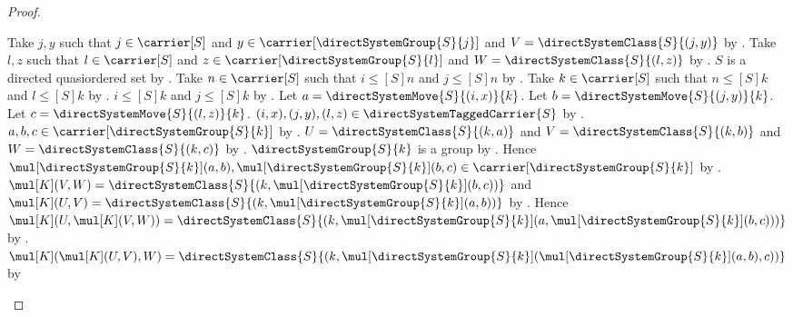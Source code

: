 \begin{proof}
\begin{subproof}
        Take $j,y$ such that $j\in\carrier[S]$ and
            $y\in\carrier[\directSystemGroup{S}{j}]$ and
            $V=\directSystemClass{S}{(j,y)}$ by
            .
        Take $l,z$ such that $l\in\carrier[S]$ and
            $z\in\carrier[\directSystemGroup{S}{l}]$ and
            $W=\directSystemClass{S}{(l,z)}$ by
            .
        $S$ is a directed quasiordered set by
            .
        Take $n\in\carrier[S]$ such that
            $i\mathrel{\leq[S]}n$ and $j\mathrel{\leq[S]}n$ by
            .
        Take $k\in\carrier[S]$ such that
            $n\mathrel{\leq[S]}k$ and $l\mathrel{\leq[S]}k$ by
            .
        $i\mathrel{\leq[S]}k$ and $j\mathrel{\leq[S]}k$ by
            .
        Let $a=\directSystemMove{S}{(i,x)}{k}$.
        Let $b=\directSystemMove{S}{(j,y)}{k}$.
        Let $c=\directSystemMove{S}{(l,z)}{k}$.
        $(i,x),(j,y),(l,z)\in\directSystemTaggedCarrier{S}$ by
            .
        $a,b,c\in\carrier[\directSystemGroup{S}{k}]$ by
            .
        $U=\directSystemClass{S}{(k,a)}$ and
            $V=\directSystemClass{S}{(k,b)}$ and
            $W=\directSystemClass{S}{(k,c)}$ by
            .
        $\directSystemGroup{S}{k}$ is a group by
            .
        Hence $\mul[\directSystemGroup{S}{k}](a,b),
            \mul[\directSystemGroup{S}{k}](b,c)\in
            \carrier[\directSystemGroup{S}{k}]$ by
            .
        $\mul[K](V,W)=\directSystemClass{S}
            {(k,\mul[\directSystemGroup{S}{k}](b,c))}$ and
            $\mul[K](U,V)=\directSystemClass{S}
            {(k,\mul[\directSystemGroup{S}{k}](a,b))}$ by
            .
        Hence $\mul[K](U,\mul[K](V,W))=
            \directSystemClass{S}
                {(k,\mul[\directSystemGroup{S}{k}]
                    (a,\mul[\directSystemGroup{S}{k}](b,c)))}$ by
            .
        $\mul[K](\mul[K](U,V),W)=
            \directSystemClass{S}
                {(k,\mul[\directSystemGroup{S}{k}]
                    (\mul[\directSystemGroup{S}{k}](a,b),c))}$ by

\end{subproof}
\end{proof}
